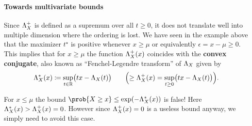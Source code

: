 \paragraph*{Towards multivariate bounds}
Since \(\Lambda_X^+\) is defined as a supremum over all \(t\ge 0\), it does not
translate well into multiple dimension where the ordering is lost.
We have seen in the example above that the maximizer \(t^\star\) is positive
whenever \(x\ge \mu\) or equivalently \(\epsilon = x - \mu \ge 0\).
This implies that for \(x\ge \mu\) the function \(\Lambda_X^+(x)\) coincides
with the \textbf{convex conjugate}, also known as ``Fenchel-Legendre transform''
of \(\Lambda_X\) given by
\[
    \Lambda_X^*(x) \coloneq \sup_{t\in \mathbb{R}} \bigl(t x - \Lambda_X(t)\bigr)
    \qquad \Bigl(\ge \Lambda_X^+(x)= \sup_{t \ge 0} \bigl(t x - \Lambda_X(t)\bigr)\Bigr).
\]
\begin{warning}
    \label{warn: difference between CGF star and plus}
    For \(x\le \mu\) the bound \(\prob{X \ge x} \le \exp(-\CGF_X^*(x))\) is
    false! Here \(\Lambda_X^*(x) > \Lambda_X^+(x) = 0\).  However since
   \(\Lambda_X^+(x)=0\) is a useless bound anyway, we simply need to avoid this
    case.
\end{warning}



